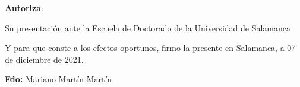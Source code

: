 \bigskip
\textbf{Autoriza}:
\bigskip

Su presentación ante la Escuela de Doctorado de la Universidad de Salamanca

\bigskip

Y para que conste a los efectos oportunos, firmo la presente en Salamanca, a 07 de diciembre de 2021. 

\bigskip

\bigskip

\bigskip

\bigskip

\bigskip

%
%
%
%


\textbf{Fdo:} Mariano Martín Martín 


%	

